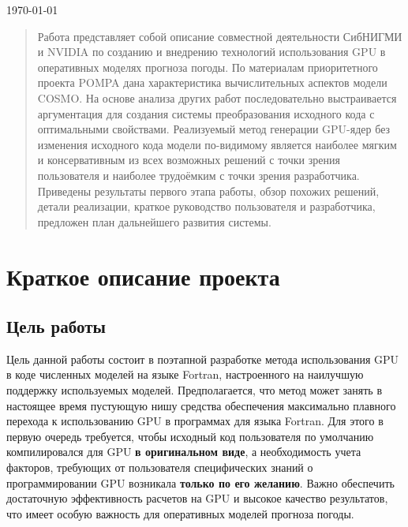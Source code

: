 \documentclass[a4,12pt]{report}
\begin{document}
\begin{titlepage}
\begin{center}
\vfill

{\large \today}

\end{center}

\end{titlepage}

\tableofcontents

\begin{abstract}
Работа представляет собой описание совместной деятельности СибНИГМИ и NVIDIA по созданию и внедрению технологий использования GPU в оперативных моделях прогноза погоды. По материалам приоритетного проекта POMPA дана характеристика вычислительных аспектов модели COSMO. На основе анализа других работ последовательно выстраивается аргументация для создания системы преобразования исходного кода с оптимальными свойствами. Реализуемый метод генерации GPU-ядер без изменения исходного кода модели по-видимому является наиболее мягким и консервативным из всех возможных решений с точки зрения пользователя и наиболее трудоёмким с точки зрения разработчика. Приведены результаты первого этапа работы, обзор похожих решений, детали реализации, краткое руководство пользователя и разработчика, предложен план дальнейшего развития системы.
\end{abstract}

\chapter{Краткое описание проекта}

\section{Цель работы}

Цель данной работы состоит в поэтапной разработке метода использования GPU в коде численных моделей на языке Fortran, настроенного на наилучшую поддержку используемых моделей. Предполагается, что метод может занять в настоящее время пустующую нишу средства обеспечения максимально плавного перехода к использованию GPU в программах для языка Fortran. Для этого в первую очередь требуется, чтобы исходный код пользователя по умолчанию компилировался для GPU \textbf{в оригинальном виде}, а необходимость учета факторов, требующих от пользователя специфических знаний о программировании GPU возникала \textbf{только по его желанию}. Важно обеспечить достаточную эффективность расчетов на GPU и высокое качество результатов, что имеет особую важность для оперативных моделей прогноза погоды.
\end{document}
